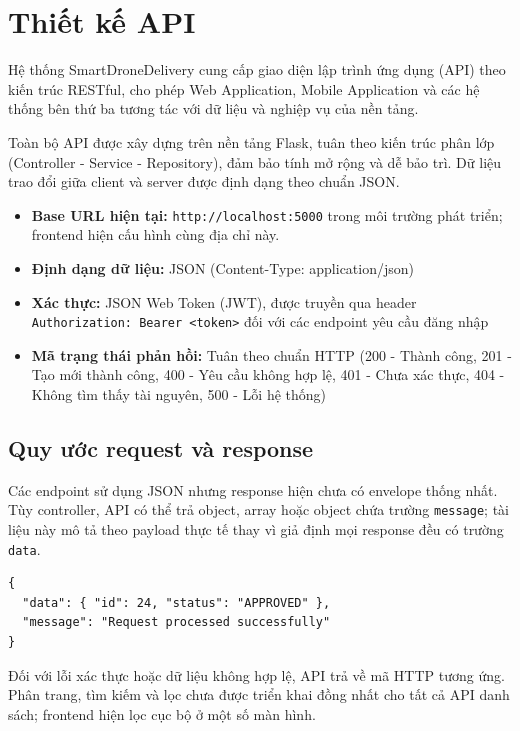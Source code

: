 \section{Thiết kế API}

Hệ thống SmartDroneDelivery cung cấp giao diện lập trình ứng dụng (API) theo kiến trúc RESTful, cho phép Web Application, Mobile Application và các hệ thống bên thứ ba tương tác với dữ liệu và nghiệp vụ của nền tảng.

Toàn bộ API được xây dựng trên nền tảng Flask, tuân theo kiến trúc phân lớp (Controller - Service - Repository), đảm bảo tính mở rộng và dễ bảo trì. Dữ liệu trao đổi giữa client và server được định dạng theo chuẩn JSON.

\begin{itemize}
\item
  \textbf{Base URL hiện tại:} \texttt{http://localhost:5000} trong môi trường phát triển; frontend hiện cấu hình cùng địa chỉ này.
\item
  \textbf{Định dạng dữ liệu:} JSON (Content-Type: application/json)
\item
  \textbf{Xác thực:} JSON Web Token (JWT), được truyền qua header \texttt{Authorization: Bearer <token>} đối với các endpoint yêu cầu đăng nhập
\item
  \textbf{Mã trạng thái phản hồi:} Tuân theo chuẩn HTTP (200 - Thành công, 201 - Tạo mới thành công, 400 - Yêu cầu không hợp lệ, 401 - Chưa xác thực, 404 - Không tìm thấy tài nguyên, 500 - Lỗi hệ thống)
\end{itemize}

\subsection{Quy ước request và response}

Các endpoint sử dụng JSON nhưng response hiện chưa có envelope thống nhất. Tùy controller, API có thể trả object, array hoặc object chứa trường \texttt{message}; tài liệu này mô tả theo payload thực tế thay vì giả định mọi response đều có trường \texttt{data}.

\begin{verbatim}
{
  "data": { "id": 24, "status": "APPROVED" },
  "message": "Request processed successfully"
}
\end{verbatim}

Đối với lỗi xác thực hoặc dữ liệu không hợp lệ, API trả về mã HTTP tương ứng. Phân trang, tìm kiếm và lọc chưa được triển khai đồng nhất cho tất cả API danh sách; frontend hiện lọc cục bộ ở một số màn hình.

